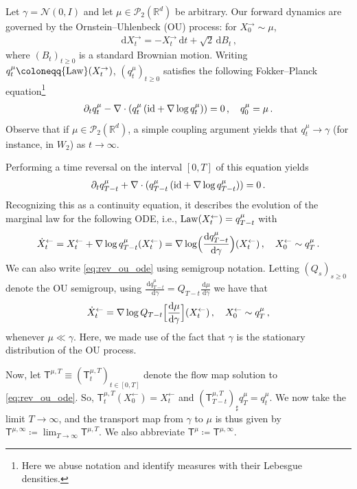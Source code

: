 \documentclass[12pt]{article}
\newcommand{\cN}{\mathcal{N}}
\newcommand{\cP}{\mathcal{P}}
\newcommand{\RR}{\mathbb{R}}
\newcommand{\R}{\RR}
\newcommand{\1}{\mathds{1}}
\newcommand*{\defeq}{\coloneqq}
\newcommand*{\rd}{\mathrm{d}}
\newcommand*{\dd}{\, \rd}
\newcommand{\deq}{\coloneqq}
\renewcommand{\geq}{\geqslant}
\renewcommand{\ge}{\geqslant}
\theoremstyle{plain}
\theoremstyle{definition}
\theoremstyle{remark}
\begin{document}
Let $\gamma = \cN(0,I)$ and let $\mu \in \cP_2(\R^d)$ be arbitrary. Our forward dynamics are governed by the Ornstein--Uhlenbeck (OU) process: for $X_0^{\rightarrow} \sim \mu$, 
\begin{align}\label{eq:ou}
    \dd X_t^\rightarrow = - X_t^{\rightarrow}{\dd t} + \sqrt{2}\dd B_t\,,
\end{align}
where $(B_t)_{t \geq 0}$ is a standard Brownian motion. Writing $q_t^\mu \defeq {\rm Law}(X_t^{\rightarrow})$, $(q_t^\mu)_{t\ge 0}$ satisfies the following Fokker--Planck equation\footnote{Here we  abuse notation and identify measures with their Lebesgue densities.}
\begin{align*}
    \partial_t q_t^\mu - \nabla \cdot (q_t^\mu\, ({\rm id} + \nabla \log q_t^\mu)) = 0\,, \quad q_0^\mu = \mu\,.
\end{align*}
Observe that if $\mu \in \cP_2(\mathbb{R}^d)$, a simple coupling argument yields that $q_t^\mu \to \gamma$ (for instance, in $W_2$) as $t \to \infty$. 

Performing a time reversal on the interval $[0,T]$ of this equation yields
\begin{align*}
    \partial_t q^\mu_{T-t} + \nabla \cdot (q^\mu_{T-t}\,({\rm id} +  \nabla \log q^\mu_{T-t})) = 0\,. 
\end{align*}
Recognizing this as a continuity equation, it describes the evolution of the marginal law for the following ODE, i.e., ${\rm Law}(X_t^{\leftarrow}) = q^\mu_{T-t}$ with
\begin{align}\label{eq:rev_ou_ode}
    \dot X_t^{\leftarrow} = X_t^{\leftarrow} + \nabla \log q^\mu_{T-t}(X_t^\leftarrow) = \nabla \log\Bigl( \frac{\!\dd q^\mu_{T-t}}{\!\dd \gamma}\Bigr)(X_t^\leftarrow) \,, \quad X_0^\leftarrow \sim q^\mu_T\,.
\end{align}
We can also write \eqref{eq:rev_ou_ode} using semigroup notation. Letting $(Q_s)_{s \geq 0}$ denote the OU semigroup, using $\frac{\dd q^\mu_{T-t}}{\dd \gamma} = Q_{T-t}\frac{\dd \mu}{\dd \gamma}$ we have that
\begin{align}\label{eq:ode_semigroup}
    \dot X_t^{\leftarrow} 
    = \nabla \log Q_{T-t}\Bigl[\frac{\!\dd\mu}{\!\dd\gamma}\Bigr](X_t^{\leftarrow})\,, \quad X_0^\leftarrow \sim q^\mu_T\,,
\end{align}
whenever $\mu \ll \gamma$.
Here, we made use of the fact that $\gamma$ is the stationary distribution of the OU process.

Now, let $\mathsf T^{\mu,T} \equiv (\mathsf T^{\mu,T}_t)_{t \in [0,T]}$ denote the flow map solution to \eqref{eq:rev_ou_ode}. So, $\mathsf T^{\mu,T}_{t}(X^{\leftarrow}_0) = X^{\leftarrow}_t$ and $(\mathsf T^{\mu,T}_{T-t})_\sharp q^\mu_T = q^\mu_t$. We now take the limit $T \to\infty$, and the transport map from $\gamma$ to $\mu$ is thus given by $\mathsf T^{\mu,\infty} \defeq \lim_{T\to\infty} \mathsf T^{\mu,T}$.
{We also abbreviate $\mathsf T^\mu \deq \mathsf T^{\mu,\infty}$.}
\end{document}
